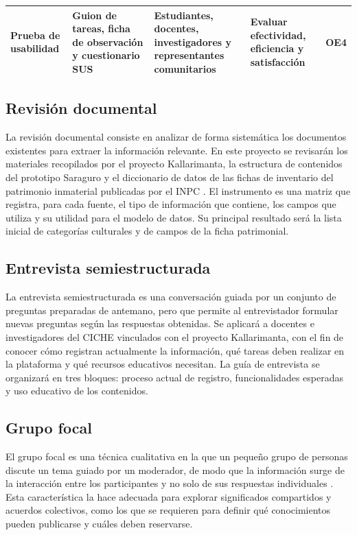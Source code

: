 {\begin{tabular}{|p{}|p{}|p{}|p{}|p{}|}
    \hline
    \raggedright\hspace{0pt}Prueba de usabilidad & \raggedright\hspace{0pt}Guion de tareas, ficha de observación y cuestionario SUS & \raggedright\hspace{0pt}Estudiantes, docentes, investigadores y representantes comunitarios & \raggedright\hspace{0pt}Evaluar efectividad, eficiencia y satisfacción & \raggedright\hspace{0pt}OE4 \tabularnewline
    \hline
  \end{tabular}\par}

\subsection{Revisión documental}
La revisión documental consiste en analizar de forma sistemática los documentos existentes para extraer la información relevante. En este proyecto se revisarán los materiales recopilados por el proyecto Kallarimanta, la estructura de contenidos del prototipo Saraguro \cite{quezada2026mobile} y el diccionario de datos de las fichas de inventario del patrimonio inmaterial publicadas por el INPC \cite{inpc2025datos}. El instrumento es una matriz que registra, para cada fuente, el tipo de información que contiene, los campos que utiliza y su utilidad para el modelo de datos. Su principal resultado será la lista inicial de categorías culturales y de campos de la ficha patrimonial.

\subsection{Entrevista semiestructurada}
La entrevista semiestructurada es una conversación guiada por un conjunto de preguntas preparadas de antemano, pero que permite al entrevistador formular nuevas preguntas según las respuestas obtenidas. Se aplicará a docentes e investigadores del CICHE vinculados con el proyecto Kallarimanta, con el fin de conocer cómo registran actualmente la información, qué tareas deben realizar en la plataforma y qué recursos educativos necesitan. La guía de entrevista se organizará en tres bloques: proceso actual de registro, funcionalidades esperadas y uso educativo de los contenidos.

\subsection{Grupo focal}
El grupo focal es una técnica cualitativa en la que un pequeño grupo de personas discute un tema guiado por un moderador, de modo que la información surge de la interacción entre los participantes y no solo de sus respuestas individuales \cite{hamui2013grupos}. Esta característica la hace adecuada para explorar significados compartidos y acuerdos colectivos, como los que se requieren para definir qué conocimientos pueden publicarse y cuáles deben reservarse.

